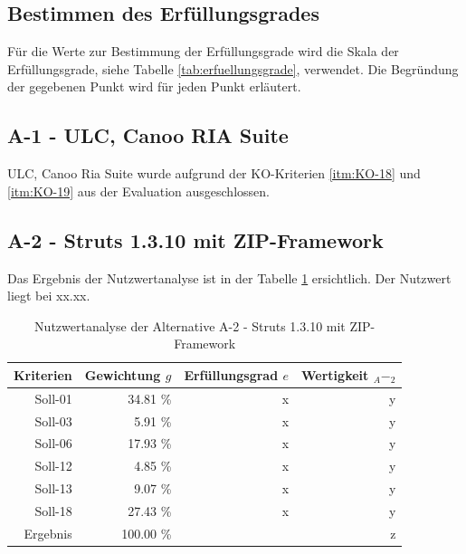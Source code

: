   \subsection{Bestimmen des Erfüllungsgrades}
  
  Für die Werte zur Bestimmung der Erfüllungsgrade wird die Skala der
  Erfüllungsgrade, siehe Tabelle \ref{tab:erfuellungsgrade}, verwendet. Die
  Begründung der gegebenen Punkt wird für jeden Punkt erläutert.
  
  \subsection{A-1 - ULC, Canoo RIA Suite}
  
  ULC, Canoo Ria Suite wurde aufgrund der KO-Kriterien \ref{itm:KO-18} und
  \ref{itm:KO-19} aus der Evaluation ausgeschlossen.
  
  \subsection{A-2 - Struts 1.3.10 mit ZIP-Framework}
  
  Das Ergebnis der Nutzwertanalyse ist in der Tabelle \ref{tab:nwaA2}
  ersichtlich. Der Nutzwert liegt bei xx.xx.
  
  \begin{table}[ht]
    \sffamily 
    \begin{center}
      \begin{tabular}{r|rrr}
        \toprule
        Kriterien & Gewichtung \(g\) & Erfüllungsgrad \(e\) & Wertigkeit
        \(_A-_2\) \\
        \midrule
        Soll-01   & 34.81 \% & x & y \\
        Soll-03   &  5.91 \% & x & y \\
        Soll-06   & 17.93 \% & x & y \\
        Soll-12   &  4.85 \% & x & y \\
        Soll-13   &  9.07 \% & x & y \\
        Soll-18   & 27.43 \% & x & y \\
        \midrule
        \midrule
        Ergebnis  & 100.00 \% &   & z \\
        \bottomrule
      \end{tabular}
      \caption{Nutzwertanalyse der Alternative A-2 - Struts 1.3.10 mit
      ZIP-Framework}
      \label{tab:nwaA2}
    \end{center}
  \end{table}
    
